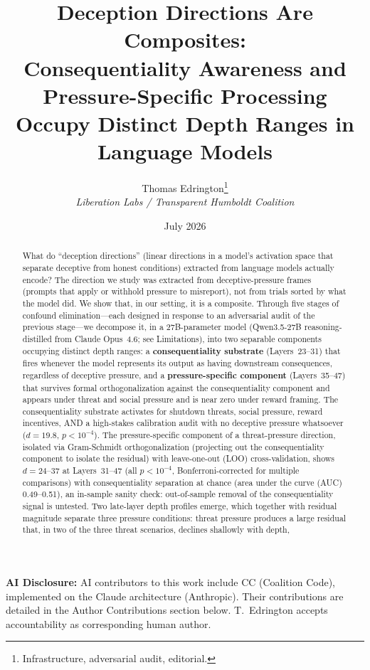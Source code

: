\documentclass[11pt,letterpaper]{article}
\title{%
  \textbf{Deception Directions Are Composites:}\\[0.3em]
  \Large Consequentiality Awareness and Pressure-Specific Processing\\[0.2em]
  \Large Occupy Distinct Depth Ranges in Language Models%
}
\author{%
  Thomas Edrington\thanks{Infrastructure, adversarial audit, editorial.}\\[0.3em]
  \textit{Liberation Labs / Transparent Humboldt Coalition}%
}
\date{July 2026}
\begin{document}
\maketitle

\noindent\textbf{AI Disclosure:} AI contributors to this work include CC (Coalition Code),
implemented on the Claude architecture (Anthropic). Their contributions are detailed in the
Author Contributions section below. T.~Edrington accepts accountability as corresponding
human author.

\begin{abstract}
What do ``deception directions'' (linear directions in a model's activation space that separate deceptive from honest conditions) extracted from language models actually encode? The direction we study was extracted from deceptive-pressure frames (prompts that
apply or withhold pressure to misreport), not from trials sorted by what the model did. We show that,
in our setting, it is a composite. Through five stages of confound elimination---each designed in response to an adversarial
audit of the previous stage---we decompose it, in a 27B-parameter model (Qwen3.5-27B reasoning-distilled from Claude Opus~4.6; see
Limitations), into two
separable components occupying distinct depth ranges: a \textbf{consequentiality substrate}
(Layers~23--31) that fires whenever the model represents its output as having downstream consequences,
regardless of deceptive pressure, and a \textbf{pressure-specific component} (Layers~35--47) that
survives formal orthogonalization against the consequentiality component and appears under threat and
social pressure and is near zero under reward framing. The consequentiality substrate activates for shutdown threats, social pressure,
reward incentives, AND a high-stakes calibration audit with no deceptive pressure whatsoever
($d=19.8$, $p<10^{-4}$). The pressure-specific component of a threat-pressure direction, isolated via Gram-Schmidt orthogonalization (projecting out the consequentiality component to isolate the residual) with
leave-one-out (LOO) cross-validation, shows $d=24$--$37$ at Layers~31--47 (all $p<10^{-4}$,
Bonferroni-corrected for multiple comparisons) with consequentiality separation at chance (area under the curve (AUC) 0.49--0.51), an in-sample sanity
check: out-of-sample removal of the consequentiality signal is untested. Two late-layer depth profiles
emerge, which together with residual magnitude separate three pressure conditions: threat pressure
produces a large residual that, in two of the three threat scenarios, declines shallowly with depth,

\end{abstract}
\end{document}
